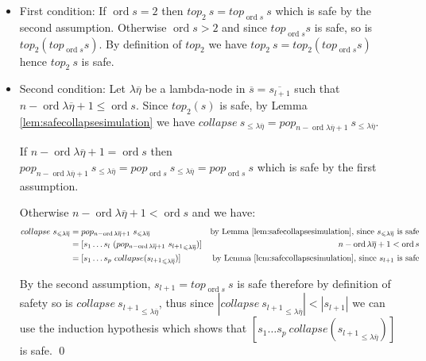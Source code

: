 \documentclass{article}
\newcommand{\ord}{\mathop{\mathrm{ord}}}
\newcommand{\prefixof}{\leqslant}
\theoremstyle{remark}
\theoremstyle{definition}
\newcommand\orddec\overline
\begin{document}
\begin{itemize}
\item First condition: If $\ord{s}=2$ then $top_2~s = top_{\ord s}~s$ which is safe by the second assumption. Otherwise $\ord{s}>2$ and since $top_{\ord{s}} s$ is safe, so is $top_2(top_{\ord{s}} s)$. By definition of $top_2$ we have $top_2~s = top_2(top_{\ord{s}} s)$ hence $top_2~s$ is safe.

\item Second condition: Let $\lambda \overline{\eta}$ be a lambda-node in $\orddec{s} = \orddec{s_{l+1}}$ such that $n-\ord{\lambda \overline{\eta}}+1 \leq \ord{s}$.
Since $top_2(s)$ is safe, by Lemma \ref{lem:safecollapsesimulation} we have
$collapse~s_{\prefixof \lambda \overline{\eta}} = pop_{n-\ord{\lambda \overline{\eta}}+1}~s_{\prefixof \lambda \overline{\eta}}$.

If $n-\ord{\lambda \overline{\eta}}+1 = \ord{s}$ then
$pop_{n-\ord{\lambda \overline{\eta}}+1}~s_{\prefixof \lambda \overline{\eta}} = pop_{\ord{s}}~s_{\prefixof\lambda\overline\eta} = pop_{\ord{s}}~s$ which is safe by the first assumption.

Otherwise $n-\ord{\lambda \overline{\eta}}+1 < \ord{s}$ and we have:
\begin{align*}
  collapse~s_{\prefixof\lambda\overline\eta}
      &= pop_{n-\ord{\lambda \overline{\eta}}+1}~s_{\prefixof\lambda\overline\eta} 
      & \mbox{by Lemma \ref{lem:safecollapsesimulation}, since $s_{\prefixof\lambda\overline\eta}$ is safe} \\
  &= [ s_1 \ldots s_l\ (pop_{n-\ord{\lambda\overline\eta}+1}~ {s_{l+1}}_{\prefixof\lambda\overline\eta}) ]
   & \mbox{$n-\ord{\lambda \overline{\eta}}+1<\ord{s}$}  \\
  &= [s_1 \ldots s_p~collapse({s_{l+1}}_{\prefixof\lambda\overline\eta}) ]
  & \mbox{by Lemma \ref{lem:safecollapsesimulation}, since $s_{l+1}$ is safe}
\end{align*}

By the second assumption, $s_{l+1} = top_{\ord{s}}~s$ is safe therefore by definition
of safety so is $collapse~{s_{l+1}}_{\prefixof\lambda\overline\eta}$, thus
since $|collapse~{s_{l+1}}_{\prefixof\lambda\overline\eta}| < |s_{l+1}|$ we can use the induction hypothesis which shows that $[s_1 \ldots s_p~collapse({s_{l+1}}_{\prefixof\lambda\overline\eta}) ]$ is safe.
\qed
\end{itemize}
\end{document}
